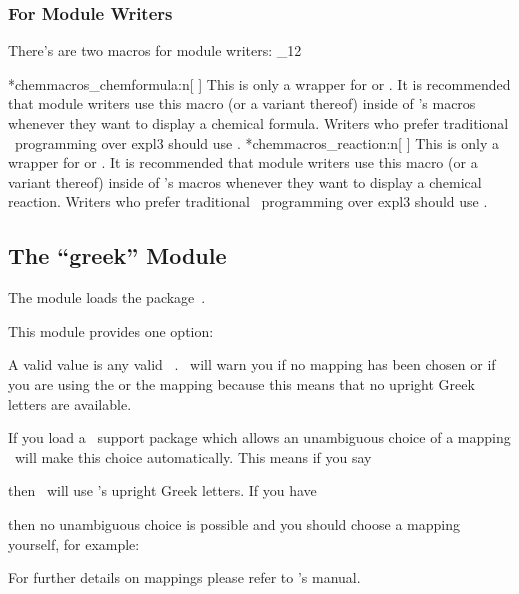 \documentclass[load-preamble+]{cnltx-doc}
\makeatletter
\def\chemmodule*#1{\textquotedblleft#1\textquotedblright}%
\renewenvironment{commands}
  {%
    \cnltx@set@catcode_{12}%
    \let\command\cnltx@command
    \cnltxlist
  }
  {\endcnltxlist}
\makeatother
\begin{document}
\subsubsection{For Module Writers}

There's are two macros for module writers:
\begin{commands}
  \command*{chemmacros_chemformula:n}[ ]
    This is only a wrapper for  or .  It is recommended that
    module writers use this macro (or a variant thereof) inside of
    \chemmacros's macros whenever they want to display a chemical formula.
    Writers who prefer traditional \LaTeXe\ programming over expl3 should use
    .
  \command*{chemmacros_reaction:n}[ ]
    This is only a wrapper for  or .  It is recommended that
    module writers use this macro (or a variant thereof) inside of
    \chemmacros's macros whenever they want to display a chemical reaction.
    Writers who prefer traditional \LaTeXe\ programming over expl3 should use
    .
\end{commands}

\subsection{The \chemmodule*{greek} Module}\label{sec:greek-module}

The  module loads the 
package~\cite{pkg:chemgreek}.

This module provides one option:
\begin{options}
    A valid value is any valid \chemgreek\ .  \chemmacros\ will
    warn you if no mapping has been chosen or if you are using the
     or the  mapping because this means that
    no upright Greek letters are available.
\end{options}
If you load a \chemgreek\ support package which allows an unambiguous choice
of a mapping \chemgreek\ will make this choice automatically.  This means if
you say
\begin{sourcecode}
  \usepackage{upgreek}
  \usepackage{chemmacros}
\end{sourcecode}
then \chemmacros\ will use 's upright Greek letters.  If you
have
\begin{sourcecode}
  \usepackage{upgreek}
  \usepackage{chemmacros}
  \usepackage{textgreek}
\end{sourcecode}
then no unambiguous choice is possible and you should choose a mapping
yourself, for example:
\begin{sourcecode}
  \usepackage{upgreek}
  \usepackage{chemmacros}
  \usepackage{textgreek}
\end{sourcecode}
For further details on mappings please refer to \chemgreek's manual.
\end{document}
